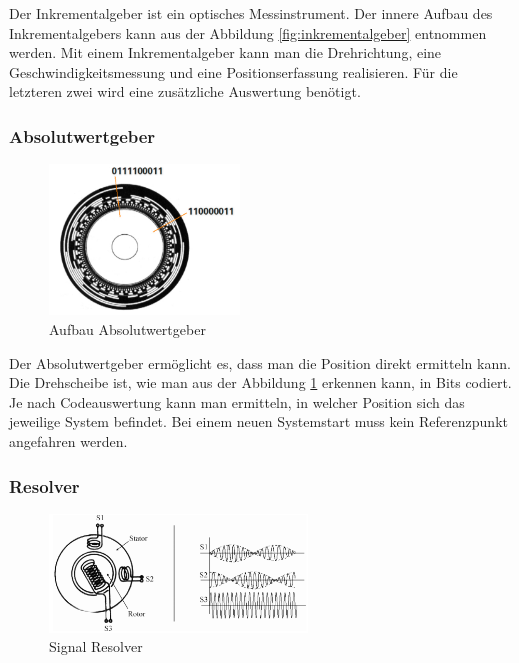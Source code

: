 Der Inkrementalgeber ist ein optisches Messinstrument. Der innere Aufbau des Inkrementalgebers kann aus der Abbildung \ref{fig:inkrementalgeber} entnommen werden. 
Mit einem Inkrementalgeber kann man die Drehrichtung, eine Geschwindigkeitsmessung und eine Positionserfassung realisieren. Für die letzteren zwei wird eine zusätzliche Auswertung benötigt. 

\newpage

\subsubsection{Absolutwertgeber}
\label{sec:absolutwertgeber}

\begin{figure}[H]
\begin{center}
	\includegraphics[width=0.45\textwidth]{fig/Absolutwertgeber}
	\caption{Aufbau Absolutwertgeber \label{fig:absolutwertgeber} \cite{aufbauAbsolutwertgeber}}
\end{center}
\end{figure}

Der Absolutwertgeber ermöglicht es, dass man die Position direkt ermitteln kann. Die Drehscheibe ist, wie man aus der Abbildung \ref{fig:absolutwertgeber} erkennen kann, in Bits codiert. Je nach Codeauswertung kann man ermitteln, in welcher Position sich das jeweilige System befindet. 
Bei einem neuen Systemstart muss kein Referenzpunkt angefahren werden.

\subsubsection{Resolver}
\label{sec:resolver}

\begin{figure}[H]
\begin{center}
	\includegraphics[width=0.61\textwidth]{fig/Resolver}
	\caption{Signal Resolver \label{fig:signalResolver} \cite{aufbauResolver}}
\end{center}
\end{figure}

